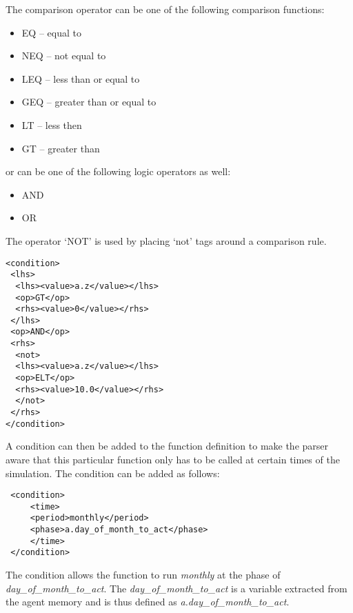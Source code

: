 
The comparison operator can be one of the following comparison functions:

\begin{itemize}
\item EQ -- equal to
\item NEQ -- not equal to
\item LEQ -- less than or equal to
\item GEQ -- greater than or equal to
\item LT -- less then
\item GT -- greater than
\end{itemize}

or can be one of the following logic operators as well:

\begin{itemize}
\item AND
\item OR
\end{itemize}

The operator `NOT' is used by placing `not' tags around a comparison rule.

\begin{mylisting}
\begin{verbatim}
<condition>
 <lhs>
  <lhs><value>a.z</value></lhs>
  <op>GT</op>
  <rhs><value>0</value></rhs>
 </lhs>
 <op>AND</op>
 <rhs>
  <not>
  <lhs><value>a.z</value></lhs>
  <op>ELT</op>
  <rhs><value>10.0</value></rhs>
  </not>
 </rhs>
</condition>
\end{verbatim}
\end{mylisting}

A condition can then be added to the function definition to make the
parser aware that this particular function only has to be called at
certain times of the simulation. The condition can be added as
follows:

\begin{mylisting}
\begin{verbatim}
 <condition>
     <time>
     <period>monthly</period>
     <phase>a.day_of_month_to_act</phase>
     </time>
 </condition>
\end{verbatim}
\end{mylisting}

The condition allows the function to run \emph{monthly} at the phase
of \emph{day\_of\_month\_to\_act}. The
\emph{day\_of\_month\_to\_act} is a variable extracted from the
agent memory and is thus defined as
\emph{a.day\_of\_month\_to\_act}.

